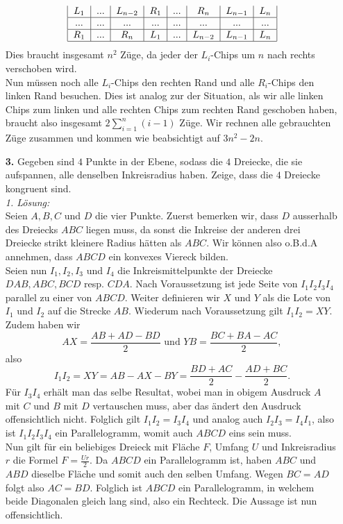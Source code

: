 \documentclass[12pt,a4paper]{article}
\theoremstyle{plain}
\theoremstyle{definition}
\theoremstyle{remark}
\begin{document}
\begin{enumerate}
\[\begin{tabular}{|c|c|c|c|c|c|c|c|}
$L_1$&$...$&$L_{n-2}$&$R_1$&$...$&$R_n$&$L_{n-1}$&$L_{n}$ \\ \hline
...&...&...&...&...&...&...&... \\ \hline
$R_1$&$...$&$R_n$&$L_1 $&$ ...$&$ L_{n-2}$&$L_{n-1}$&$L_n$ \\ \hline
\end{tabular}
\]
Dies braucht insgesamt $n^2$ Züge, da jeder der $L_i$-Chips um $n$ nach rechts verschoben wird.\\
Nun müssen noch alle $L_i$-Chips den rechten Rand und alle $R_i$-Chips den linken Rand besuchen. Dies ist analog zur der Situation, als wir alle linken Chips zum linken und alle rechten Chips zum rechten Rand geschoben haben, braucht also insgesamt $2\sum_{i=1}^n (i-1)$ Züge.
Wir rechnen alle gebrauchten Züge zusammen und kommen wie beabsichtigt auf $3n^2-2n$.

\item[\textbf{3.}] Gegeben sind $4$ Punkte in der Ebene, sodass die $4$ Dreiecke, die sie aufspannen, alle denselben Inkreisradius haben. Zeige, dass die $4$ Dreiecke kongruent sind.\\
	
\textit{1. Lösung:}\\
Seien $A,B,C$ und $D$ die vier Punkte. Zuerst bemerken wir, dass $D$ ausserhalb des Dreiecks $ABC$ liegen muss, da sonst die Inkreise der anderen drei Dreiecke strikt kleinere Radius hätten als $ABC$. Wir können also o.B.d.A annehmen, dass $ABCD$ ein konvexes Viereck bilden. \\
Seien nun $I_1,I_2,I_3$ und $I_4$ die Inkreismittelpunkte der Dreiecke $DAB,ABC,BCD$ resp. $CDA$. Nach Voraussetzung ist jede Seite von $I_1I_2I_3I_4$ parallel zu einer von $ABCD$. Weiter definieren wir $X$ und $Y$ als die Lote von $I_1$ und $I_2$ auf die Strecke $AB$. Wiederum nach Voraussetzung gilt $I_1I_2 = XY$. Zudem haben wir
\[
AX = \frac{AB+AD-BD}{2} \text{ und } YB=\frac{BC+BA-AC}{2},
\]
also
\[
I_1I_2=XY = AB-AX-BY= \frac{BD+AC}{2} - \frac{AD+BC}{2}.
\]
Für $I_3I_4$ erhält man das selbe Resultat, wobei man in obigem Ausdruck $A$ mit $C$ und $B$ mit $D$ vertauschen muss, aber das ändert den Ausdruck offensichtlich nicht. Folglich gilt $I_1I_2=I_3I_4$ und analog auch $I_2I_3 = I_4I_1$, also ist $I_1I_2I_3I_4$ ein Parallelogramm, womit auch $ABCD$ eins sein muss.\\
Nun gilt für ein beliebiges Dreieck mit Fläche $F$, Umfang $U$ und Inkreisradius $r$ die Formel $F=\frac{Ur}{2}$. Da $ABCD$ ein Parallelogramm ist, haben $ABC$ und $ABD$ dieselbe Fläche und somit auch den selben Umfang. Wegen $BC=AD$ folgt also $AC=BD$. Folglich ist $ABCD$ ein Parallelogramm, in welchem beide Diagonalen gleich lang sind, also ein Rechteck. Die Aussage ist nun offensichtlich.\\


\end{enumerate}
\end{document}
